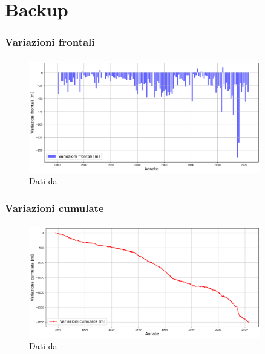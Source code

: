 \section{Backup}


\begin{frame}
    \frametitle{Variazioni frontali}
    \framesubtitle{}

    \begin{figure}
        \includegraphics[width=0.9\textwidth]{Immagini/variazioniFrontali.png}
        \caption{Dati da \cite{GLAMOS23}}
    \end{figure}
  
\end{frame}


\begin{frame}
    \frametitle{Variazioni cumulate}
    \framesubtitle{}

    \begin{figure}
        \includegraphics[width=0.9\textwidth]{Immagini/variazioniCumulative.png}
        \caption{Dati da \cite{GLAMOS23}}
    \end{figure}
  
\end{frame}


